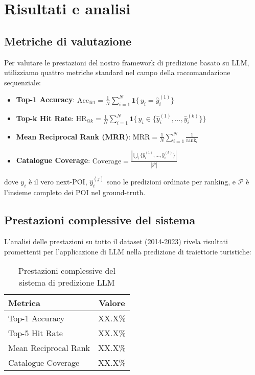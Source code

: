 \section{Risultati e analisi}

\subsection{Metriche di valutazione}

Per valutare le prestazioni del nostro framework di predizione basato su LLM, utilizziamo quattro metriche standard nel campo della raccomandazione sequenziale:

\begin{itemize}
\item \textbf{Top-1 Accuracy}: $\text{Acc}_{@1}=\frac{1}{N}\sum_{i=1}^{N}\mathbf{1}\{\,y_i=\hat{y}_i^{(1)}\}$
\item \textbf{Top-k Hit Rate}: $\text{HR}_{@k}=\frac{1}{N}\sum_{i=1}^{N}\mathbf{1}\{\,y_i\in\{\hat{y}_i^{(1)},\dots,\hat{y}_i^{(k)}\}\}$
\item \textbf{Mean Reciprocal Rank (MRR)}: $\text{MRR}=\frac{1}{N}\sum_{i=1}^{N}\frac{1}{\text{rank}_i}$
\item \textbf{Catalogue Coverage}: $\text{Coverage}=\frac{|\bigcup_{i}\{\hat{y}_i^{(1)},\dots,\hat{y}_i^{(k)}\}|}{|\mathcal{P}|}$
\end{itemize}

dove $y_i$ è il vero next-POI, $\hat{y}_i^{(j)}$ sono le predizioni ordinate per ranking, e $\mathcal{P}$ è l'insieme completo dei POI nel ground-truth.

\subsection{Prestazioni complessive del sistema}

L'analisi delle prestazioni su tutto il dataset (2014-2023) rivela risultati promettenti per l'applicazione di LLM nella predizione di traiettorie turistiche:

\begin{table}[H]
\centering
\caption{Prestazioni complessive del sistema di predizione LLM}
\label{tab:overall_performance}
\begin{tabular}{@{}lc@{}}
\toprule
Metrica & Valore \\
\midrule
Top-1 Accuracy & XX.X\% \\
Top-5 Hit Rate & XX.X\% \\
Mean Reciprocal Rank & XX.X\% \\
Catalogue Coverage & XX.X\% \\
\bottomrule
\end{tabular}
\end{table}

